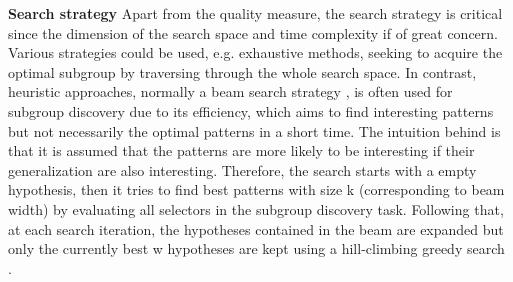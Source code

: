 \textbf{Search strategy}
Apart from the quality measure, the search strategy is critical since the dimension of the search space and time complexity if of great concern. Various strategies could be used, e.g. exhaustive methods, seeking to acquire the optimal subgroup by traversing through the whole search space. In contrast, heuristic approaches, normally a beam search strategy \cite{clark1989cn2}, is often used for subgroup discovery due to its efficiency, which aims to find interesting patterns but not necessarily the optimal patterns in a short time. The intuition behind is that it is assumed that the patterns are more likely to be interesting if their generalization are also interesting. Therefore, the search starts with a empty hypothesis, then it tries to find best patterns with size k (corresponding to beam width) by evaluating all selectors in the subgroup discovery task. Following that, at each search iteration, the hypotheses contained in the beam are expanded but only the currently best w hypotheses are kept using a hill-climbing greedy search \cite{atzmueller2015subgroup}. 




